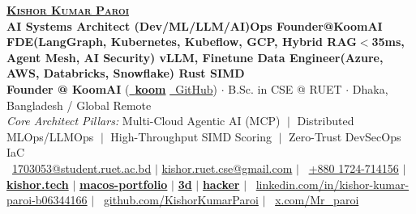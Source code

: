\documentclass[10pt,a4paper]{article}
\begin{document}
\begin{center}
    {\fontsize{18.0pt}{20.0pt}\selectfont\color{burgundy}\scshape\bfseries \href{https://kishor.tech/}{\color{burgundy}Kishor Kumar Paroi}}\\[1.5pt]
    {\fontsize{7.1pt}{8.3pt}\selectfont\textbf{AI Systems Architect \;\textbar\; (Dev/ML/LLM/AI)Ops \;\textbar\; Founder@KoomAI \;\textbar\; FDE(LangGraph, Kubernetes, Kubeflow, GCP, Hybrid RAG$<$35ms, Agent Mesh, AI Security) \;\textbar\; vLLM, Finetune \;\textbar\; Data Engineer(Azure, AWS, Databricks, Snowflake) \;\textbar\; Rust SIMD}}\\[1.5pt]
    {\fontsize{7.5pt}{8.6pt}\selectfont
        \textbf{Founder @ KoomAI} (\href{https://koom.kishor.tech/}{\faPlay\ \textbf{koom}} \;\textbar\; \href{https://github.com/KishorKumarParoi/Koom-AI}{\faGithub\ GitHub}) \quad$\cdot$\quad
        B.Sc. in CSE @ RUET \quad$\cdot$\quad
        Dhaka, Bangladesh / Global Remote
    }\\[1.4pt]
    {\fontsize{6.8pt}{7.8pt}\selectfont\color{darkgray}
        \textit{Core Architect Pillars:} Multi-Cloud Agentic AI (MCP) $\;\vert\;$ Distributed MLOps/LLMOps $\;\vert\;$ High-Throughput SIMD Scoring $\;\vert\;$ Zero-Trust DevSecOps IaC
    }\\[1.8pt]
    {\fontsize{6.8pt}{7.8pt}\selectfont
        \faEnvelope\ \href{mailto:1703053@student.ruet.ac.bd}{1703053@student.ruet.ac.bd} \quad$\vert$\quad
        \href{mailto:kishor.ruet.cse@gmail.com}{kishor.ruet.cse@gmail.com} \quad$\vert$\quad
        \faWhatsapp\ \href{https://wa.me/8801724714156}{+880 1724-714156} \quad$\vert$\quad
        \href{https://kishor.tech/}{\textbf{kishor.tech}} \quad$\vert$\quad
        \href{https://macos.kishor.tech/}{\textbf{macos-portfolio}} \quad$\vert$\quad
        \href{https://3d.kishor.tech/}{\textbf{3d}} \quad$\vert$\quad
        \href{https://hacker.kishor.tech/}{\textbf{hacker}} \quad$\vert$\quad
        \faLinkedin\ \href{https://linkedin.com/in/kishor-kumar-paroi-b06344166}{linkedin.com/in/kishor-kumar-paroi-b06344166} \quad$\vert$\quad
        \faGithub\ \href{https://github.com/KishorKumarParoi}{github.com/KishorKumarParoi} \quad$\vert$\quad
        \faTwitter\ \href{https://x.com/Mr_paroi}{x.com/Mr\_paroi}
    }

\end{center}
\end{document}

